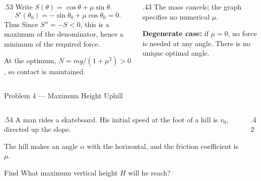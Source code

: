 \begin{solutionframe}
  \begin{columns}[T,onlytextwidth]
    \begin{column}{.53\textwidth}
      Write \(S(\theta)=\cos\theta+\mu\sin\theta\).
      \[
        S'(\theta_0)=-\sin\theta_0+\mu\cos\theta_0=0.
      \]
      Thus
      Since \(S''=-S<0\), this is a maximum of the denominator,
      hence a minimum of the required force.

      \medskip
      At the optimum, \(N=mg/(1+\mu^2)>0\), so contact is maintained.
    \end{column}
    \begin{column}{.43\textwidth}
      \medskip
      The mass cancels; the graph specifies no numerical \(\mu\).

      \medskip
      \textbf{Degenerate case:} if \(\mu=0\), no force is needed
      at any angle. There is no unique optimal angle.
    \end{column}
  \end{columns}
\end{solutionframe}

\begin{frame}{Problem 4 — Maximum Height Uphill}
  \par
  \small
  \begin{columns}[T,onlytextwidth]
    \begin{column}{.54\textwidth}
      A man rides a skateboard. His initial speed at the foot of a hill
      is \(v_0\), directed up the slope.

      \medskip
      The hill makes an angle \(\alpha\) with the horizontal,
      and the friction coefficient is \(\mu\).

      \medskip
      \begin{block}{Find}
        What maximum vertical height \(H\) will he reach?
      \end{block}

    \end{column}
    \begin{column}{.42\textwidth}
    \end{column}
  \end{columns}
\end{frame}

